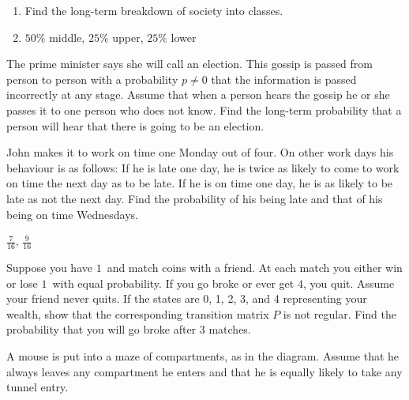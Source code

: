 \begin{multicols}{2}
\begin{ex}
\begin{enumerate}
\begin{enumerate}[label={\alph*.}]
\item Find the long-term breakdown of society into classes.

\end{enumerate}
\end{enumerate}
\begin{sol}
\begin{enumerate}[label={\alph*.}]
\setcounter{enumi}{1}
\item  $50\%$ middle, $25\%$ upper, $25\%$ lower

\end{enumerate}
\end{sol}
\end{ex}

\begin{ex}
The prime minister says she will call an election. This gossip is passed from person to person with a probability $p \neq 0$ that the information is passed incorrectly at any stage. Assume that when a person hears the gossip he or she passes it to one person who does not know. Find the long-term probability that a person will hear that there is going to be an election.
\end{ex}

\begin{ex}
John makes it to work on time one Monday out of four. On other work days his behaviour is as follows: If he is late one day, he is twice as likely to come to work on time the next day as to be late. If he is on time one day, he is as likely to be late as not the next day. Find the probability of his being late and that of his being on time Wednesdays.

\begin{sol}
$\frac{7}{16}$, $\frac{9}{16}$
\end{sol}
\end{ex}

\begin{ex}
Suppose you have $1$\textcent\ and match coins with a friend. At each match you either win or lose $1$\textcent\ with equal probability. If you go broke or ever get $4$\textcent, you quit. Assume your friend never quits. If the states are 0, 1, 2, 3, and 4 representing your wealth, show that the corresponding transition matrix $P$ is not regular. Find the probability that you will go broke after $3$ matches.
\end{ex}


\begin{ex}
A mouse is put into a maze of compartments, as in the diagram. Assume that he always leaves any compartment he enters and that he is equally likely to take any tunnel entry.



\end{ex}
\end{multicols}
